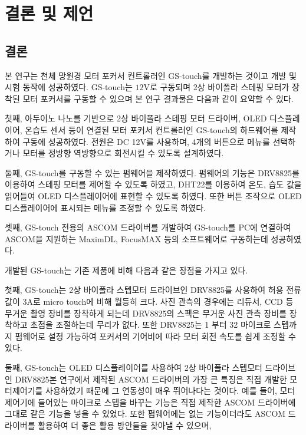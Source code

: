 \section{결론 및 제언}

\subsection{결론}
	
본 연구는 천체 망원경 모터 포커서 컨트롤러인 GS-touch를 개발하는 것이고 개발 및 시험 동작에 성공하였다.  GS-touch는 $12 \textrm{V}$로 구동되며 2상 바이폴라 스테핑 모터가 장착된 모터 포커서를 구동할 수 있으며 본 연구 결과물은 다음과 같이 요약할 수 있다. 

첫째, 아두이노 나노를 기반으로 2상 바이폴라 스테핑 모터 드라이버, OLED 디스플레이어, 온습도 센서 등이 연결된 모터 포커서 컨트롤러인 GS-touch의 하드웨어를 제작하여 구동에 성공하였다. 전원은 DC 12V를 사용하며, 4개의 버튼으로 메뉴를 선택하거나 모터를 정방향 역방향으로 회전시킬 수 있도록 설계하였다.

둘째, GS-touch를 구동할 수 있는 펌웨어을 제작하였다. 펌웨어의 기능은 DRV8825를 이용하여 스테핑 모터를 제어할 수 있도록 하였고, DHT22를 이용하여 온도, 습도 값을 읽어들여 OLED 디스플레이어에 표현할 수 있도록 하였다. 또한 버튼 조작으로 OLED 디스플레이어에 표시되는 메뉴를 조정할 수 있도록 하였다. 

셋째, GS-touch 전용의 ASCOM 드라이버를 개발하여 GS-touch를 PC에 연결하여 ASCOM을 지원하는 MaximDL, FocusMAX 등의 소프트웨어로 구동하는데 성공하였다.

개발된 GS-touch는 기존 제품에 비해 다음과 같은 장점을 가지고 있다. 

첫째, GS-touch는 2상 바이폴라 스텝모터 드라이브인 DRV8825를 사용하여 허용 전류 값이 $3 \textrm{A}$로 micro touch에 비해 월등히 크다. 사진 관측의 경우에는 리듀서, CCD 등 무거운 촬영 장비를 장착하게 되는데 DRV8825의 스펙은 무거운 사진 관측 장비를 장착하고 초점을 조절하는데 무리가 없다. 또한 DRV8825는 1 부터 32 마이크로 스텝까지 펌웨어로 설정 가능하여 포커서의 기어비에 따라 모터 회전 속도를 쉽게 조정할 수 있다. 

둘째, GS-touch는 OLED 디스플레이어를 사용하여 2상 바이폴라 스텝모터 드라이브인 DRV8825본 연구에서 제작된 ASCOM 드라이버의 가장 큰 특징은 직접 개발한 모터제어기를 사용하였기 때문에 그 연동성이 매우 뛰어나다는 것이다. 예를 들어, 모터제어기에 들어있는 마이크로 스텝을 바꾸는 기능은 직접 제작한 ASCOM 드라이버에 그대로 같은 기능을 넣을 수 있었다. 또한 펌웨어에는 없는 기능이더라도 ASCOM 드라이버를 활용하여 더 좋은 활용 방안들을 찾아낼 수 있으며, 

